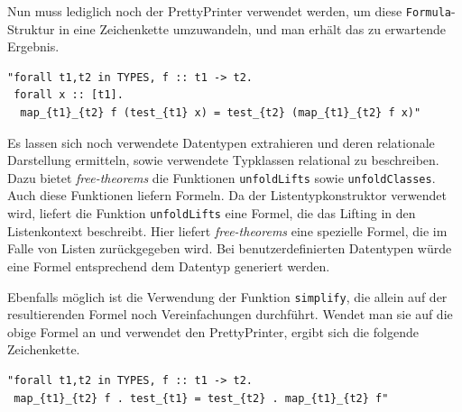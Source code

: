 Nun muss lediglich noch der PrettyPrinter verwendet werden, um diese \texttt{Formula}-Struktur in eine Zeichenkette umzuwandeln,
und man erhält das zu erwartende Ergebnis.

\begin{verbatim}
"forall t1,t2 in TYPES, f :: t1 -> t2.
 forall x :: [t1].
  map_{t1}_{t2} f (test_{t1} x) = test_{t2} (map_{t1}_{t2} f x)"
\end{verbatim}

Es lassen sich noch verwendete Datentypen extrahieren und deren relationale Darstellung ermitteln, sowie verwendete Typklassen
relational zu beschreiben. Dazu bietet \textit{free-theorems} die Funktionen \texttt{unfoldLifts} sowie \texttt{unfoldClasses}.
Auch diese Funktionen liefern Formeln. %
Da der Listentypkonstruktor verwendet wird, liefert die Funktion \texttt{unfoldLifts} eine Formel, die das Lifting in den Listenkontext
beschreibt. Hier liefert \textit{free-theorems} eine spezielle Formel, die im Falle von Listen zurückgegeben wird. Bei benutzerdefinierten
Datentypen würde eine Formel entsprechend dem Datentyp generiert werden.

Ebenfalls möglich ist die Verwendung der Funktion \texttt{simplify}, die allein auf der resultierenden Formel noch Vereinfachungen
durchführt. Wendet man sie auf die obige Formel an und verwendet den PrettyPrinter, ergibt sich die folgende
Zeichenkette.

\begin{verbatim}
"forall t1,t2 in TYPES, f :: t1 -> t2.
 map_{t1}_{t2} f . test_{t1} = test_{t2} . map_{t1}_{t2} f"
\end{verbatim}